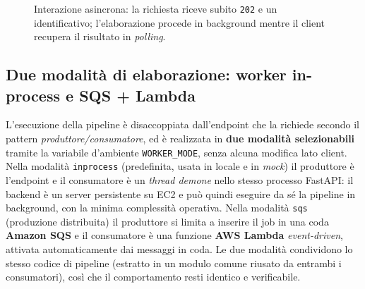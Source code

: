 \documentclass[11pt,a4paper]{article}
\begin{document}
\begin{figure}[htbp]
\centering
{}
\caption{Interazione asincrona: la richiesta riceve subito \texttt{202} e un identificativo; l'elaborazione procede in background mentre il client recupera il risultato in \emph{polling}.}
\label{fig:async}
\end{figure}

\subsection{Due modalità di elaborazione: worker in-process e SQS + Lambda}
L'esecuzione della pipeline è disaccoppiata dall'endpoint che la richiede secondo il
pattern \emph{produttore/consumatore}, ed è realizzata in \textbf{due modalità
selezionabili} tramite la variabile d'ambiente \texttt{WORKER\_MODE}, senza alcuna
modifica lato client. Nella modalità \texttt{inprocess} (predefinita, usata in locale e
in \emph{mock}) il produttore è l'endpoint e il consumatore è un \emph{thread demone}
nello stesso processo FastAPI: il backend è un server persistente su EC2 e può quindi
eseguire da sé la pipeline in background, con la minima complessità operativa. Nella
modalità \texttt{sqs} (produzione distribuita) il produttore si limita a inserire il job
in una coda \textbf{Amazon SQS} e il consumatore è una funzione \textbf{AWS Lambda}
\emph{event-driven}, attivata automaticamente dai messaggi in coda. Le due modalità
condividono lo stesso codice di pipeline (estratto in un modulo comune riusato da
entrambi i consumatori), così che il comportamento resti identico e verificabile.
\end{document}
